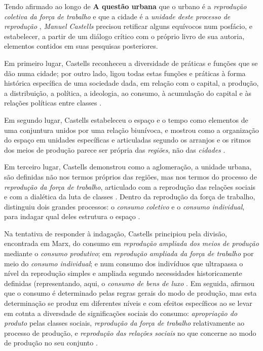 Tendo afirmado ao longo de \textbf{A questão urbana} que o urbano é a \textit{reprodução coletiva da força de trabalho} e que a cidade é a \textit{unidade deste processo de reprodução} \cite[p.~550]{CASTELLS2000}, \textit{Manuel Castells} precisou retificar alguns equívocos num posfácio, e estabelecer, a partir de um diálogo crítico com o próprio livro de sua autoria, elementos contidos em suas pesquisas posteriores. 

Em primeiro lugar, Castells reconheceu a diversidade de práticas e funções que se dão numa cidade; por outro lado, ligou todas estas funções e práticas à forma histórica específica de uma sociedade dada, em relação com o capital, a produção, a distribuição, a política, a ideologia, ao consumo, à acumulação do capital e às relações políticas entre classes \cite[p.~550-551]{CASTELLS2000}. 

Em segundo lugar, Castells estabeleceu o espaço e o tempo como elementos de uma conjuntura unidos por uma relação biunívoca, e mostrou como a organização do espaço em unidades específicas e articuladas segundo os arranjos e os ritmos dos meios de produção parece ser própria das \textit{regiões}, não das \textit{cidades} \cite[p.~554-555]{CASTELLS2000}.

Em terceiro lugar, Castells demonstrou como a aglomeração, a unidade urbana, são definidas não nos termos próprios das regiões, mas nos termos do processo de \textit{reprodução da força de trabalho}, articulado com a reprodução das relações sociais e com a dialética da luta de classes \cite[p.~556-557]{CASTELLS2000}. Dentro da reprodução da força de trabalho, distinguiu dois grandes processos: o \textit{consumo coletivo} e o \textit{consumo individual}, para indagar qual deles estrutura o espaço \cite[p.~557]{CASTELLS2000}. 

Na tentativa de responder à indagação, Castells principiou pela divisão, encontrada em Marx, do consumo em \textit{reprodução ampliada dos meios de produção} mediante o \textit{consumo produtivo}; em \textit{reprodução ampliada da força de trabalho} por meio do \textit{consumo individual}; e num consumo dos indivíduos que ultrapassa o nível da reprodução simples e ampliada segundo  necessidades historicamente definidas (representando, aqui, o \textit{consumo de bens de luxo} \cite[p.~568]{CASTELLS2000}. Em seguida, afirmou que o consumo é determinado pelas regras gerais do modo de produção, mas esta determinação se produz em diferentes níveis e com efeitos específicos ao se levar em cotnta a diversdade de significações sociais do consumo: \textit{apropriação do produto} pelas classes sociais, \textit{reprodução da força de trabalho} relativamente ao processo de produção, e \textit{reprodução das relações sociais} no que concerne ao modo de produção no seu conjunto \cite[p.~569]{CASTELLS2000}. 

